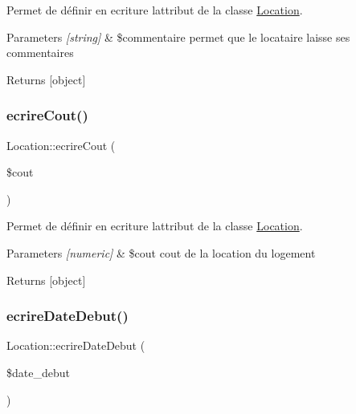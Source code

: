 Permet de définir en ecriture l\textquotesingle{}attribut de la classe \hyperlink{class_location}{Location}. 


\begin{DoxyParams}{Parameters}
{\em \mbox{[}string\mbox{]}} & \$commentaire permet que le locataire laisse ses commentaires \\
\hline
\end{DoxyParams}
\begin{DoxyReturn}{Returns}
\mbox{[}object\mbox{]} 
\end{DoxyReturn}
\mbox{\label{class_location_a3190a299ed70340cd0cf5a96c4441f95}} 
\subsubsection{\texorpdfstring{ecrire\+Cout()}{ecrireCout()}}
{\footnotesize\ttfamily Location\+::ecrire\+Cout (\begin{DoxyParamCaption}\item[{}]{\$cout }\end{DoxyParamCaption})}



Permet de définir en ecriture l\textquotesingle{}attribut de la classe \hyperlink{class_location}{Location}. 


\begin{DoxyParams}{Parameters}
{\em \mbox{[}numeric\mbox{]}} & \$cout cout de la location du logement \\
\hline
\end{DoxyParams}
\begin{DoxyReturn}{Returns}
\mbox{[}object\mbox{]} 
\end{DoxyReturn}
\mbox{\label{class_location_a70c7958200c34c3df4110390e11f8bcd}} 
\subsubsection{\texorpdfstring{ecrire\+Date\+Debut()}{ecrireDateDebut()}}
{\footnotesize\ttfamily Location\+::ecrire\+Date\+Debut (\begin{DoxyParamCaption}\item[{}]{\$date\+\_\+debut }\end{DoxyParamCaption})}



